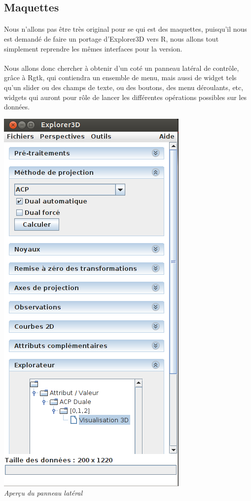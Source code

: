 \subsection{Maquettes}
\paragraph{}
Nous n'allons pas être très original pour se qui est des maquettes, puisqu'il nous est demandé de faire un portage d'Explorer3D vers R, nous allons tout simplement reprendre les mêmes interfaces pour la version.

\paragraph{} Nous allons donc chercher à obtenir d'un coté un panneau latéral de contrôle, grâce à Rgtk, qui contiendra un ensemble de menu, mais aussi de widget tels qu'un slider ou des champs de texte, ou des boutons, des menu déroulants, etc, widgets qui auront pour rôle de lancer les différentes opérations possibles sur les données.\\

\begin{center}
\includegraphics[scale=0.7]{panneau.png}\\
\textit{Aperçu du panneau latéral}\\
\end{center}

